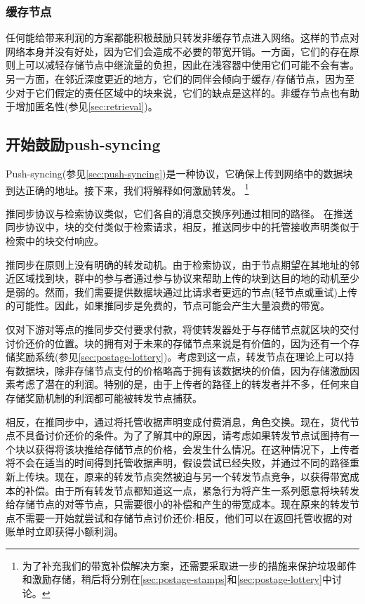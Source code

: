 \subsubsection{缓存节点}

任何能给带来利润的方案都能积极鼓励只转发非缓存节点进入网络。这样的节点对网络本身并没有好处，因为它们会造成不必要的带宽开销。一方面，它们的存在原则上可以减轻存储节点中继流量的负担，因此在浅容器中使用它们可能不会有害。另一方面，在邻近深度更近的地方，它们的同伴会倾向于缓存/存储节点，因为至少对于它们假定的责任区域中的块来说，它们的缺点是这样的。非缓存节点也有助于增加匿名性(参见\ref{sec:retrieval})。

\subsection{开始鼓励push-syncing\statusgreen}\label{sec:push-sync-incentives}

\green{}

Push-syncing(参见\ref{sec:push-syncing})是一种协议，它确保上传到网络中的数据块到达正确的地址。接下来，我们将解释如何激励转发。
%
%
\footnote{为了补充我们的带宽补偿解决方案，还需要采取进一步的措施来保护垃圾邮件和激励存储，稍后将分别在\ref{sec:postage-stamps}和\ref{sec:postage-lottery}中讨论。}



推同步协议与检索协议类似，它们各自的消息交换序列通过相同的路径。
在推送同步协议中，块的交付类似于检索请求，相反，推送同步中的托管接收声明类似于检索中的块交付响应。

推同步在原则上没有明确的转发动机。由于检索协议，由于节点期望在其地址的邻近区域找到块，群中的参与者通过参与协议来帮助上传的块到达目的地的动机至少是弱的。然而，我们需要提供数据块通过比请求者更远的节点(轻节点或重试)上传的可能性。因此，如果推同步是免费的，节点可能会产生大量浪费的带宽。 

仅对下游对等点的推同步交付要求付款，将使转发器处于与存储节点就区块的交付讨价还价的位置。块的拥有对于未来的存储节点来说是有价值的，因为还有一个存储奖励系统(参见\ref{sec:postage-lottery})。考虑到这一点，转发节点在理论上可以持有数据块，除非存储节点支付的价格略高于拥有该数据块的价值，因为存储激励因素考虑了潜在的利润。特别的是，由于上传者的路径上的转发者并不多，任何来自存储奖励机制的利润都可能被转发节点捕获。

相反，在推同步中，通过将托管收据声明变成付费消息，角色交换。现在，货代节点不具备讨价还价的条件。为了了解其中的原因，请考虑如果转发节点试图持有一个块以获得将该块推给存储节点的价格，会发生什么情况。在这种情况下，上传者将不会在适当的时间得到托管收据声明，假设尝试已经失败，并通过不同的路径重新上传块。现在，原来的转发节点突然被迫与另一个转发节点竞争，以获得带宽成本的补偿。由于所有转发节点都知道这一点，紧急行为将产生一系列愿意将块转发给存储节点的对等节点，只需要很小的补偿和产生的带宽成本。现在原来的转发节点不需要一开始就尝试和存储节点讨价还价:相反，他们可以在返回托管收据的对账单时立即获得小额利润。 


